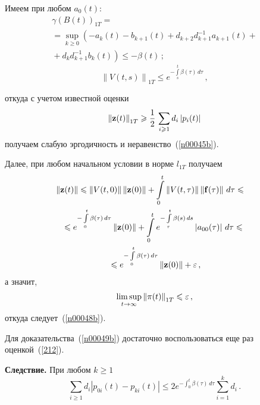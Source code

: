 \begin{multicols}{2}
Имеем при любом  $a_0(t)$:
\begin{multline*}
\gamma \left(B(t)\right)_{1T} =\\
{}=
\sup_{ k \ge 0} \left(-a_k(t)-b_{k+1}(t)+d_{k+2} d_{k+1}^{-1}
a_{k+1}(t)\right.+{}\\
{}+\left.d_{k}d_{k+1}^{-1} b_k(t)\right) \le -\beta (t)\,;
\end{multline*}
\begin{equation*}
\left\|V(t,s)\right\|_{1T} \le e^{-\int\limits_s^t \beta (\tau)\, d\tau}\,,
\end{equation*}
\pagebreak

\noindent
откуда с учетом известной оценки~\cite{z06}
\begin{equation}
\left\|{\bf z}(t)\right\|_{1T} \ge \fr{1}{2}\,\sum_{i \ge 1}
d_i\left|p_i(t)\right| 
\label{212}
\end{equation}
получаем слабую эргодичность и неравенство~(\ref{n00045b}).

Далее, при любом начальном условии в норме  $l_{1T}$ получаем
\begin{multline*}
\!\!\!\!\!\left\|{\bf z}(t)\right\| \le \left\|V(t,0)\right\| \left\|{\bf
z}(0)\right\| + \int\limits_0^t
\left\|V(t,\tau)\right\| \left\|{\bf f}(\tau)\right\|\, d\tau \le {} \\
\le  e^{-\int\limits_0^t  \beta (\tau)\, d\tau}\left\|{\bf z}(0)\right\| +
\int\limits_0^t e^{-\int\limits_\tau^t \beta (s)\, d s}  \left|a_{00}(\tau)\right| \, d\tau  \le{} \\
{}\le
 e^{-\int\limits_0^t   \beta (\tau)\, d\tau}\left\|{\bf z}(0)\right\| +
\varepsilon\,,
\end{multline*}
а значит,
\begin{eqnarray*}
\limsup_{t \to \infty} \left\|{\bf \pi}(t)\right\|_{1T} \le
 \varepsilon\,,
\label{212002}
\end{eqnarray*}
откуда следует~(\ref{n00048b}). 

Для доказательства~(\ref{n00049b}) 
достаточно воспользоваться еще раз оценкой~(\ref{212}).

\bigskip

\noindent
{\bf Следствие.} При любом $k \ge 1$
\begin{equation*} 
\sum_{i \ge 1} d_i \left|p_{0i}(t) - p_{ki}(t)\right|
\le 2e^{-\int_0^t \beta (\tau)\, d\tau}  \sum_{i=1}^{k} d_i\,.
\end{equation*}

\bigskip


\end{multicols}
